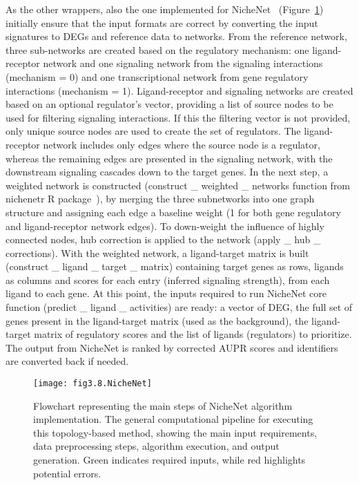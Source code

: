 As the other wrappers, also the one implemented for NicheNet~\cite{RN42} (Figure~\ref{fig:fig3.8.NicheNet}) initially ensure that the input formats are correct by converting the input signatures to DEGs and reference data to networks. From the reference network, three sub-networks are created based on the regulatory mechanism: one ligand-receptor network and one signaling network from the signaling interactions (mechanism = 0) and one transcriptional network from gene regulatory interactions (mechanism = 1). Ligand-receptor and signaling networks are created based on an optional regulator's vector, providing a list of source nodes to be used for filtering signaling interactions. 
If this the filtering vector is not provided, only unique source nodes are used to create the set of regulators. The ligand-receptor network includes only edges where the source node is a regulator, whereas the remaining edges are presented in the signaling network, with the downstream signaling cascades down to the target genes. In the next step, a weighted network is constructed (construct \_ weighted \_ networks function from nichenetr \gls{R} package~\cite{RN42}), by merging the three subnetworks into one graph structure and assigning each edge a baseline weight (1 for both gene regulatory and ligand-receptor network edges). 
To down-weight the influence of highly connected nodes, hub correction is applied to the network (apply \_ hub \_ corrections). With the weighted network, a ligand-target matrix is built (construct \_ ligand \_ target \_ matrix) containing target genes as rows, ligands as columns and scores for each entry (inferred signaling strength), from each ligand to each gene. At this point, the inputs required to run NicheNet core function (predict \_ ligand \_ activities) are ready: a vector of DEG, the full set of genes present in the ligand-target matrix (used as the background), the ligand-target matrix of regulatory scores and the list of ligands (regulators) to prioritize. The output from NicheNet is ranked by corrected \gls{AUPR} scores and identifiers are converted back if needed.

\begin{figure}[htbp]
    \centering
    \texttt{[image: fig3.8.NicheNet]}
    \caption{Flowchart representing the main steps of NicheNet algorithm implementation. The general computational pipeline for executing this topology-based method, showing the main input requirements, data preprocessing steps, algorithm execution, and output generation. Green indicates required inputs, while red highlights potential errors.}
    \label{fig:fig3.8.NicheNet}
\end{figure}

